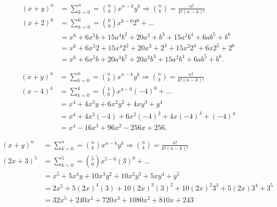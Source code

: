 \begin{question}[Expand: $(x + 2)^{6}$]
  \begin{align}
    (x + y)^{n} &= \sum_{k = 0}^{n} = {n \choose k}x^{n - k}y^{k} \Rightarrow {n \choose k} = \frac{n!}{k!(n - k)!} \\
    (x + 2)^{6} &= \sum_{k = 0}^{6} = {6 \choose 0}x^{6 - 0}2^{0} + \ldots \\
                &= x^{6} + 6x^{5} b + 15a^{4} b^{2} + 20a^{3} + b^{3} + 15a^{2} b^{4} + 6ab^{5} + b^{6} \\
                &= x^{6} + 6x^{5} 2 + 15x^{4} 2^{2} + 20x^{3} + 2^{3} + 15x^{2} 2^{4} + 6x2^{5} + 2^{6} \\
                &= \boxed{x^{6} + 6x^{5} b + 20a^3b^2 + 20a^3b^3 + 15a^2b^{4} + 6ab^{5} + b^{6}}
  .\end{align}
\end{question}

\begin{question}[Expand: $(x - 4)^{4}$]
  \begin{align}
    (x + y)^{n} &= \sum_{k = 0}^{n} = {n \choose k}x^{n - k}y^{k} \Rightarrow {n \choose k} = \frac{n!}{k!(n - k)!} \\
    (x - 4)^{4} &= \sum_{k = 0}^{4} = {4 \choose 0}x^{4 - 0} (-4)^{0} + \ldots \\
                &= x^{4} + 4x^3y + 6x^2y^2 + 4xy^3 + y^{4} \\
                &= x^{4} + 4x^3(-4) + 6x^2(-4)^2 + 4x(-4)^3 + (-4)^{4} \\
                &= \boxed{x^{4} - 16x^3 + 96x^2 - 256x + 256}
  .\end{align}
\end{question}

\begin{question}[Expand: $(2x + 3)^{5}$]
  \begin{align}
    (x + y)^{n}   &= \sum_{k = 0}^{n} = {n \choose k}x^{n - k}y^{k} \Rightarrow {n \choose k} = \frac{n!}{k!(n - k)!} \\
    (2x + 3)^{5}  &= \sum_{k = 0}^{5} = {5 \choose 0}x^{5 - 0} (3)^{0} + \ldots \\
                  &= x^{5} + 5x^{4}y + 10x^3y^2 + 10x^2y^3 + 5xy^{4} + y^{5} \\
                  &= 2x^{5} + 5(2x)^{4}(3) + 10(2x)^3(3)^2 + 10(2x)^2 3^3 + 5(2x)3^{4} + 3^{5} \\
                  &= \boxed{32x^{5} + 240x^{4} + 720x^3 + 1080x^2 + 810x + 243}
  \end{align}
\end{question}

